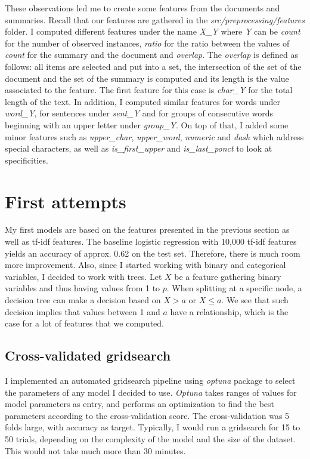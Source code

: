 \documentclass{article}
\begin{document}
\begin{multicols}{2}
These observations led me to create some features from the documents and summaries. Recall that our features are gathered in the \textit{src/preprocessing/features} folder. I computed different features under the name \textit{X\_Y} where \textit{Y} can be \textit{count} for the number of observed instances, \textit{ratio} for the ratio between the values of \textit{count} for the summary and the document and \textit{overlap}. The \textit{overlap} is defined as follows: all items are selected and put into a set, the intersection of the set of the document and the set of the summary is computed and its length is the value associated to the feature. The first feature for this case is \textit{char\_Y} for the total length of the text. In addition, I computed similar features for words under \textit{word\_Y}, for sentences under \textit{sent\_Y} and for groups of consecutive words beginning with an upper letter under \textit{group\_Y}. On top of that, I added some minor features such as \textit{upper\_char}, \textit{upper\_word}, \textit{numeric} and \textit{dash} which address special characters, as well as \textit{is\_first\_upper} and \textit{is\_last\_ponct} to look at specificities. 

\section{First attempts}

My first models are based on the features presented in the previous section as well as tf-idf features. The baseline logistic regression with 10,000 tf-idf features yields an accuracy of approx. 0.62 on the test set. Therefore, there is much room more improvement. Also, since I started working with binary and categorical variables, I decided to work with trees. Let $X$ be a feature gathering
binary variables and thus having values from 1 to $p$. When splitting
at a specific node,
a decision tree can make a decision based on $X > a$ or $X \leq a$.
We see that such decision implies that values between 1 and $a$ have
a relationship, which is the case for a lot of features that we computed.

\subsection{Cross-validated gridsearch}

I implemented an automated gridsearch pipeline
using \textit{optuna} package to select the parameters of any model
I decided to use. \textit{Optuna}\cite{optuna} takes ranges of values for
model parameters as entry, and performs an optimization to find the best
parameters according to the cross-validation score. The cross-validation
was 5 folds large, with accuracy as target. Typically, I would run a
gridsearch for 15 to 50 trials, depending on the complexity of the model
and the size of the dataset. This would not take much more than 30 minutes.


\end{multicols}
\end{document}

